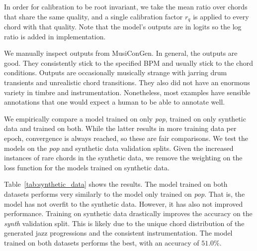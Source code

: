In order for calibration to be root invariant, we take the mean ratio over chords that share the same quality, and a single calibration factor \(r_q\) is applied to every chord with that quality. Note that the model's outputs are in logits so the log ratio is added in implementation.

We manually inspect outputs from MusiConGen. In general, the outputs are good. They consistently stick to the specified BPM and usually stick to the chord conditions. Outputs are occasionally musically strange with jarring drum transients and unrealistic chord transitions. They also did not have an enormous variety in timbre and instrumentation. Nonetheless, most examples have sensible annotations that one would expect a human to be able to annotate well. 

We empirically compare a model trained on only \emph{pop}, trained on only synthetic data and trained on both. While the latter results in more training data per epoch, convergence is always reached, so these are fair comparisons. We test the models on the \emph{pop} and synthetic data validation splits. Given the increased instances of rare chords in the synthetic data, we remove the weighting on the loss function for the models trained on synthetic data.

Table~\ref{tab:synthetic_data} shows the results. The model trained on both datasets performs very similarly to the model only trained on \emph{pop}. That is, the model has not overfit to the synthetic data. However, it has also not improved performance. Training on synthetic data drastically improves the accuracy on the \emph{synth} validation split. This is likely due to the unique chord distribution of the generated jazz progressions and the consistent instrumentation. The model trained on both datasets performs the best, with an accuracy of $51.0\%$.

